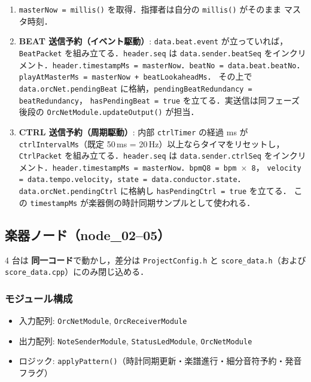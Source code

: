 \documentclass[lualatex,book,paper=a4paper,jafontsize=11.5pt,jafontscale=1.05]{jlreq}
\begin{document}
\begin{enumerate}
  \item \texttt{masterNow = millis()} を取得．指揮者は自分の \texttt{millis()} がそのまま
        マスタ時刻．
  \item \textbf{BEAT 送信予約（イベント駆動）}: \texttt{data.beat.event} が立っていれば，
        \texttt{BeatPacket} を組み立てる．\texttt{header.seq} は \texttt{data.sender.beatSeq}
        をインクリメント．\texttt{header.timestampMs = masterNow}．\texttt{beatNo = data.beat.beatNo}．
        \texttt{playAtMasterMs = masterNow + beatLookaheadMs}．
        その上で \texttt{data.orcNet.pendingBeat} に格納，\texttt{pendingBeatRedundancy = beatRedundancy}，
        \texttt{hasPendingBeat = true} を立てる．実送信は同フェーズ後段の
        \texttt{OrcNetModule.updateOutput()} が担当．
  \item \textbf{CTRL 送信予約（周期駆動）}: 内部 \texttt{ctrlTimer} の経過 ms が
        \texttt{ctrlIntervalMs}（既定 50\,ms = 20\,Hz）以上ならタイマをリセットし，
        \texttt{CtrlPacket} を組み立てる．\texttt{header.seq} は \texttt{data.sender.ctrlSeq}
        をインクリメント．\texttt{header.timestampMs = masterNow}．\texttt{bpmQ8 = bpm $\times$ 8}，
        \texttt{velocity = data.tempo.velocity}，\texttt{state = data.conductor.state}．
        \texttt{data.orcNet.pendingCtrl} に格納し \texttt{hasPendingCtrl = true} を立てる．
        この \texttt{timestampMs} が楽器側の時計同期サンプルとして使われる．
\end{enumerate}


\subsection{楽器ノード（node\_02--05）}\label{sec:proc-flow-performer}

4 台は \textbf{同一コード}で動かし，差分は \texttt{ProjectConfig.h} と
\texttt{score\_data.h}（および \texttt{score\_data.cpp}）にのみ閉じ込める．

\subsubsection{モジュール構成}

\begin{itemize}
  \item 入力配列: \texttt{OrcNetModule}, \texttt{OrcReceiverModule}
  \item 出力配列: \texttt{NoteSenderModule}, \texttt{StatusLedModule}, \texttt{OrcNetModule}
  \item ロジック: \texttt{applyPattern()}（時計同期更新・楽譜進行・細分音符予約・発音フラグ）
\end{itemize}
\end{document}
